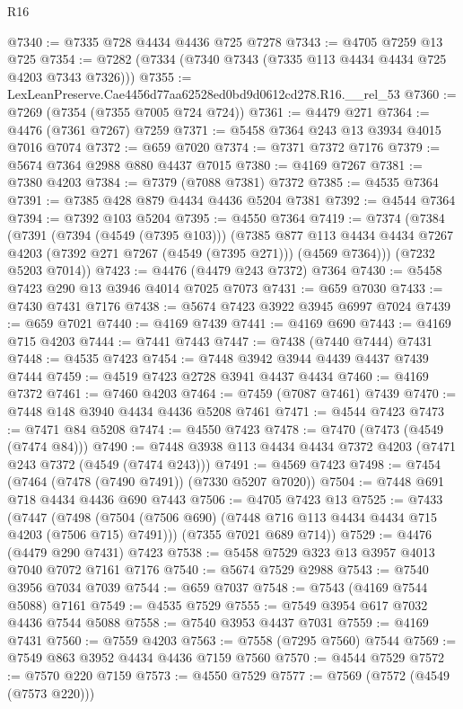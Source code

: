 \begin{lexlean}{R16}
\begin{coremodule}
@7340 := @7335 @728 @4434 @4436 @725 @7278
@7343 := @4705 @7259 @13 @725
@7354 := @7282 (@7334 (@7340 @7343 (@7335 @113 @4434 @4434 @725 @4203 @7343 @7326)))
@7355 := LexLeanPreserve.Cae4456d77aa62528ed0bd9d0612cd278.R16.__rel_53
@7360 := @7269 (@7354 (@7355 @7005 @724 @724))
@7361 := @4479 @271
@7364 := @4476 (@7361 @7267) @7259
@7371 := @5458 @7364 @243 @13 @3934 @4015 @7016 @7074
@7372 := @659 @7020
@7374 := @7371 @7372 @7176
@7379 := @5674 @7364 @2988 @880 @4437 @7015
@7380 := @4169 @7267
@7381 := @7380 @4203
@7384 := @7379 (@7088 @7381) @7372
@7385 := @4535 @7364
@7391 := @7385 @428 @879 @4434 @4436 @5204 @7381
@7392 := @4544 @7364
@7394 := @7392 @103 @5204
@7395 := @4550 @7364
@7419 := @7374
    (@7384
      (@7391
        (@7394 (@4549 (@7395 @103)))
        (@7385
          @877
          @113
          @4434
          @4434
          @7267
          @4203
          (@7392 @271 @7267 (@4549 (@7395 @271)))
          (@4569 @7364)))
      (@7232 @5203 @7014))
@7423 := @4476 (@4479 @243 @7372) @7364
@7430 := @5458 @7423 @290 @13 @3946 @4014 @7025 @7073
@7431 := @659 @7030
@7433 := @7430 @7431 @7176
@7438 := @5674 @7423 @3922 @3945 @6997 @7024
@7439 := @659 @7021
@7440 := @4169 @7439
@7441 := @4169 @690
@7443 := @4169 @715 @4203
@7444 := @7441 @7443
@7447 := @7438 (@7440 @7444) @7431
@7448 := @4535 @7423
@7454 := @7448 @3942 @3944 @4439 @4437 @7439 @7444
@7459 := @4519 @7423 @2728 @3941 @4437 @4434
@7460 := @4169 @7372
@7461 := @7460 @4203
@7464 := @7459 (@7087 @7461) @7439
@7470 := @7448 @148 @3940 @4434 @4436 @5208 @7461
@7471 := @4544 @7423
@7473 := @7471 @84 @5208
@7474 := @4550 @7423
@7478 := @7470 (@7473 (@4549 (@7474 @84)))
@7490 := @7448 @3938 @113 @4434 @4434 @7372 @4203 (@7471 @243 @7372 (@4549 (@7474 @243)))
@7491 := @4569 @7423
@7498 := @7454 (@7464 (@7478 (@7490 @7491)) (@7330 @5207 @7020))
@7504 := @7448 @691 @718 @4434 @4436 @690 @7443
@7506 := @4705 @7423 @13
@7525 := @7433
    (@7447
      (@7498 (@7504 (@7506 @690) (@7448 @716 @113 @4434 @4434 @715 @4203 (@7506 @715) @7491)))
      (@7355 @7021 @689 @714))
@7529 := @4476 (@4479 @290 @7431) @7423
@7538 := @5458 @7529 @323 @13 @3957 @4013 @7040 @7072 @7161 @7176
@7540 := @5674 @7529 @2988
@7543 := @7540 @3956 @7034 @7039
@7544 := @659 @7037
@7548 := @7543 (@4169 @7544 @5088) @7161
@7549 := @4535 @7529
@7555 := @7549 @3954 @617 @7032 @4436 @7544 @5088
@7558 := @7540 @3953 @4437 @7031
@7559 := @4169 @7431
@7560 := @7559 @4203
@7563 := @7558 (@7295 @7560) @7544
@7569 := @7549 @863 @3952 @4434 @4436 @7159 @7560
@7570 := @4544 @7529
@7572 := @7570 @220 @7159
@7573 := @4550 @7529
@7577 := @7569 (@7572 (@4549 (@7573 @220)))

\end{coremodule}
\end{lexlean}
